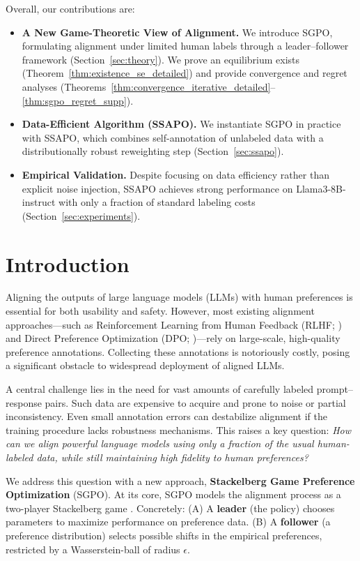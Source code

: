 Overall, our contributions are:
\begin{itemize}
\item \textbf{A New Game-Theoretic View of Alignment.} We introduce SGPO, formulating alignment under limited human labels through a leader--follower framework (Section~\ref{sec:theory}). We prove an equilibrium exists (Theorem~\ref{thm:existence_se_detailed}) and provide convergence and regret analyses (Theorems~\ref{thm:convergence_iterative_detailed}--\ref{thm:sgpo_regret_supp}).
\item \textbf{Data-Efficient Algorithm (SSAPO).} We instantiate SGPO in practice with SSAPO, which combines self-annotation of unlabeled data with a distributionally robust reweighting step (Section~\ref{sec:ssapo}). 
\item \textbf{Empirical Validation.} Despite focusing on data efficiency rather than explicit noise injection, SSAPO achieves strong performance on Llama3-8B-instruct with only a fraction of standard labeling costs (Section~\ref{sec:experiments}).
\end{itemize}



\section{Introduction}
\label{sec:intro}

Aligning the outputs of large language models (LLMs) with human preferences is essential for both usability and safety. However, most existing alignment approaches---such as Reinforcement Learning from Human Feedback (RLHF; \cite{Christiano2017DeepRLHF}) and Direct Preference Optimization (DPO; \cite{Rafailov2023DirectPreference})---rely on large-scale, high-quality preference annotations. Collecting these annotations is notoriously costly, posing a significant obstacle to widespread deployment of aligned LLMs.

A central challenge lies in the need for vast amounts of carefully labeled prompt--response pairs. Such data are expensive to acquire and prone to noise or partial inconsistency. Even small annotation errors can destabilize alignment if the training procedure lacks robustness mechanisms. This raises a key question:
\textit{How can we align powerful language models using only a fraction of the usual human-labeled data, while still maintaining high fidelity to human preferences?}

We address this question with a new approach, \textbf{Stackelberg Game Preference Optimization} (SGPO). At its core, SGPO models the alignment process as a two-player Stackelberg game \cite{VonStackelberg1934Marktform,Basar1999DynamicNG}. Concretely:
(A) A \textbf{leader} (the policy) chooses parameters to maximize performance on preference data.
(B) A \textbf{follower} (a preference distribution) selects possible shifts in the empirical preferences, restricted by a Wasserstein-ball of radius $\epsilon$.


